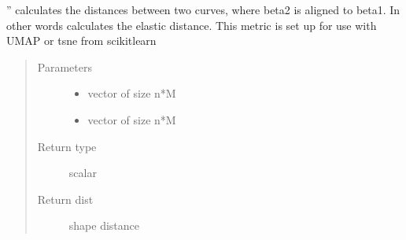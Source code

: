 \documentclass[letterpaper,10pt,english]{sphinxmanual}
\begin{document}
\begin{fulllineitems}
\label{\detokenize{umap_metric:umap_metric.efda_distance_curve}}
”
calculates the distances between two curves, where 
beta2 is aligned to beta1. In other words calculates the elastic distance.
This metric is set up for use with UMAP or t\sphinxhyphen{}sne from scikit\sphinxhyphen{}learn
\begin{quote}\begin{description}
\item[{Parameters}] \leavevmode\begin{itemize}
\item {} 
 \textendash{} vector of size n*M

\item {} 
 \textendash{} vector of size n*M

\end{itemize}

\item[{Return type}] \leavevmode
scalar

\item[{Return dist}] \leavevmode
shape distance

\end{description}\end{quote}

\end{fulllineitems}
\end{document}
